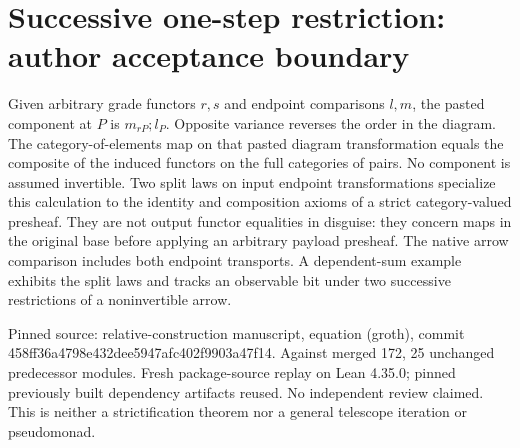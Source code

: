 \documentclass{article}
\begin{document}
\section*{Successive one-step restriction: author acceptance boundary}
Given arbitrary grade functors $r,s$ and endpoint comparisons $l,m$, the pasted component at $P$ is $m_{rP};l_P$. Opposite variance reverses the order in the diagram. The category-of-elements map on that pasted diagram transformation equals the composite of the induced functors on the full categories of pairs. No component is assumed invertible. Two split laws on input endpoint transformations specialize this calculation to the identity and composition axioms of a strict category-valued presheaf. They are not output functor equalities in disguise: they concern maps in the original base before applying an arbitrary payload presheaf. The native arrow comparison includes both endpoint transports. A dependent-sum example exhibits the split laws and tracks an observable bit under two successive restrictions of a noninvertible arrow.

Pinned source: relative-construction manuscript, equation (groth), commit 458ff36a4798e432dee5947afc402f9903a47f14. Against merged 172, 25 unchanged predecessor modules. Fresh package-source replay on Lean 4.35.0; pinned previously built dependency artifacts reused. No independent review claimed. This is neither a strictification theorem nor a general telescope iteration or pseudomonad.
\end{document}
